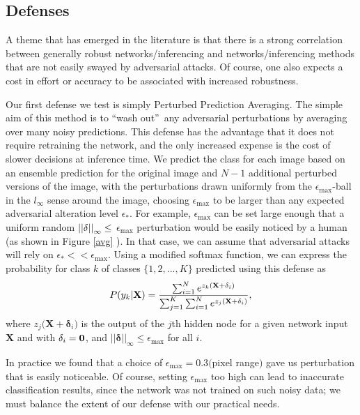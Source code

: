 \documentclass[conference]{IEEEtran}
\begin{document}
\subsection{Defenses}

A theme that has emerged in the literature is that there is a strong
correlation between generally robust networks/inferencing and
networks/inferencing methods that are not easily swayed by adversarial
attacks. Of course, one also expects a cost in effort or accuracy to be
associated with increased robustness.

Our first defense we test is simply Perturbed Prediction Averaging. The
simple aim of this method is to \textquotedblleft wash
out\textquotedblright\ any adversarial perturbations by averaging over many
noisy predictions. This defense has the advantage that it does not require
retraining the network, and the only increased expense is the cost of slower
decisions at inference time. We predict the class for each image based on an
ensemble prediction for the original image and $N-1$ additional perturbed
versions of the image, with the perturbations drawn uniformly from the $%
\epsilon _{\max }$-ball in the $l_{\infty }$ sense around the image,
choosing $\epsilon _{\max }$ to be larger than any expected adversarial
alteration level $\epsilon _{\ast }$. For example, $\epsilon _{\max }$ can
be set large enough that a uniform random $\left\vert \left\vert \mathbf{%
\delta }\right\vert \right\vert _{\infty }\leq $ $\epsilon _{\max }$
perturbation would be easily noticed by a human (as shown in Figure \ref{avg}%
). In that case, we can assume that adversarial attacks will rely on $%
\epsilon _{\ast }<<\epsilon _{\max }$. Using a modified softmax function, we
can express the probability for class $k$ of classes $\{1,2,...,K\}$
predicted using this defense as%
\begin{equation*}
P(y_{k}\rvert \mathbf{X})=\frac{\sum_{i=1}^{N}e^{z_{k}(\mathbf{X}+\mathbf{%
\delta }_{i}\mathbf{)}}}{\sum_{j=1}^{K}\sum_{i=1}^{N}e^{z_{j}(\mathbf{X}+%
\mathbf{\delta }_{i}\mathbf{)}}},
\end{equation*}%
where $z_{j}(\mathbf{X}+\mathbf{\delta }_{i}\mathbf{)}$ is the output of the 
$j$th hidden node for a given network input $\mathbf{X}$ and with $\mathbf{%
\delta }_{i}=\mathbf{0}$, and $\left\vert \left\vert \mathbf{\delta }%
\right\vert \right\vert _{\infty }\leq \epsilon _{\max }$ for all $i$.

In practice we found that a choice of $\epsilon _{\max }=0.3($pixel range$)$
gave us perturbation that is easily noticeable. Of course, setting $\epsilon
_{\max }$ too high can lead to inaccurate classification results, since the
network was not trained on such noisy data; we must balance the extent of
our defense with our practical needs.
\end{document}
